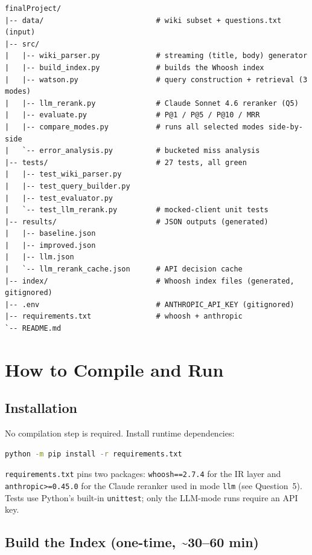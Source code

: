 \documentclass[11pt]{article}
\begin{document}
\begin{lstlisting}
finalProject/
|-- data/                          # wiki subset + questions.txt (input)
|-- src/
|   |-- wiki_parser.py             # streaming (title, body) generator
|   |-- build_index.py             # builds the Whoosh index
|   |-- watson.py                  # query construction + retrieval (3 modes)
|   |-- llm_rerank.py              # Claude Sonnet 4.6 reranker (Q5)
|   |-- evaluate.py                # P@1 / P@5 / P@10 / MRR
|   |-- compare_modes.py           # runs all selected modes side-by-side
|   `-- error_analysis.py          # bucketed miss analysis
|-- tests/                         # 27 tests, all green
|   |-- test_wiki_parser.py
|   |-- test_query_builder.py
|   |-- test_evaluator.py
|   `-- test_llm_rerank.py         # mocked-client unit tests
|-- results/                       # JSON outputs (generated)
|   |-- baseline.json
|   |-- improved.json
|   |-- llm.json
|   `-- llm_rerank_cache.json      # API decision cache
|-- index/                         # Whoosh index files (generated, gitignored)
|-- .env                           # ANTHROPIC_API_KEY (gitignored)
|-- requirements.txt               # whoosh + anthropic
`-- README.md
\end{lstlisting}

\section{How to Compile and Run}

\subsection{Installation}

No compilation step is required. Install runtime dependencies:

\begin{lstlisting}[language=bash]
python -m pip install -r requirements.txt
\end{lstlisting}

\texttt{requirements.txt} pins two packages: \texttt{whoosh==2.7.4} for the
IR layer and \texttt{anthropic>=0.45.0} for the Claude reranker used in
mode \texttt{llm} (see Question~5). Tests use Python's built-in
\texttt{unittest}; only the LLM-mode runs require an API key.

\subsection{Build the Index (one-time, \textasciitilde30--60 min)}
\end{document}
